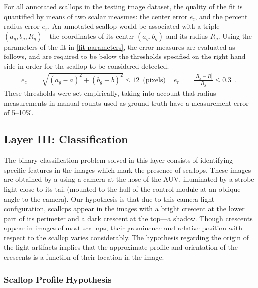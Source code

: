 For all annotated scallops in the testing image dataset, the quality of the fit is quantified by means of two scalar measures:
the center error $e_c$, and the percent radius error $e_r$.
An annotated scallop would be associated with a triple 
$(a_g, b_g,R_g)$---the coordinates of its center $(a_g,b_g)$ and its radius $R_g$.
Using the parameters of the fit in \eqref{fit-parameters}, the error measures are evaluated as follows, and are required to be below the thresholds specified on the right hand side in order for the scallop to be considered detected.
%
\begin{align*}	%
      e_c &= \sqrt{(a_g-a)^2 + (b_g-b)^2}\leq12 \enspace  \text{(pixels) } & 
      e_r &= \frac{| R_g - R |}{R_g} \leq0.3   \enspace.
\end{align*}
%
These thresholds were
set empirically, taking into account that radius measurements
in manual counts  used as ground truth \cite{walker} have a measurement error of 5--10\%. 



\subsection{Layer III: Classification} \label{subsec:layer3}

The binary classification problem solved in this layer consists of identifying specific features in the images which mark the presence of scallops.
These images are obtained by a using a 
camera at the nose of the AUV, illuminated by a strobe light close to its tail 
(mounted to the hull of the control module at an oblique angle to the camera).
Our hypothesis is that due to this camera-light configuration, scallops appear in the images with 
a bright crescent at the lower part of its perimeter and a dark crescent at the top---a shadow.
Though crescents appear in images of most scallops, their prominence and relative position with respect to the scallop varies considerably.
The hypothesis regarding the origin of the light artifacts implies that the approximate profile and orientation of the crescents is a function of their location in the image.



\subsubsection{Scallop Profile Hypothesis} \label{subsubsec:scallop_profile_hypothesis}

